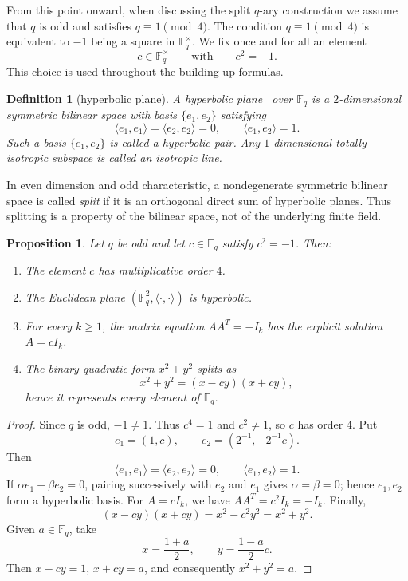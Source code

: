 \documentclass[12pt]{article}
\newtheorem{defn}{Definition}[section]
\newtheorem{prop}[theorem]{Proposition}
\newcommand{\F}{\mathbb{F}}
\begin{document}


From this point onward, when discussing the split \(q\)-ary construction we assume that \(q\) is odd and satisfies \(q \equiv 1 \pmod 4\). The condition \(q \equiv 1 \pmod 4\) is equivalent to $-1$ being a square in $\F_q^\times$. We fix once and for all an element
\[
c \in \F_q^\times \qquad \text{with} \qquad c^2 = -1.
\]
This choice is used throughout the building-up formulas.


\begin{defn}[hyperbolic plane]\label{def:hyp}
{\rm
A hyperbolic plane~\cite{Ser} over $\F_q$ is a $2$-dimensional symmetric bilinear space with basis $\{e_1,e_2\}$ satisfying
\[
\langle e_1,e_1\rangle = \langle e_2,e_2\rangle = 0,
\qquad
\langle e_1,e_2\rangle = 1.
\]
Such a basis \(\{e_1,e_2\}\) is called a hyperbolic pair. Any $1$-dimensional totally isotropic subspace is called an isotropic line.
}
\end{defn}

In even dimension and odd characteristic, a nondegenerate symmetric
bilinear space is called \emph{split} if it is an orthogonal direct sum of
hyperbolic planes. Thus splitting is a property of the bilinear space, not
of the underlying finite field.

\begin{prop}\label{prop:split-consequences}
Let \(q\) be odd and let \(c\in\F_q\) satisfy \(c^2=-1\). Then:
\begin{enumerate}[label=(\roman*)]
\item The element $c$ has multiplicative order $4$.
\item The Euclidean plane $(\F_q^2,\langle \cdot,\cdot\rangle)$ is hyperbolic.
\item For every $k \ge 1$, the matrix equation $AA^T = -I_k$ has the explicit solution $A=cI_k$.
\item The binary quadratic form $x^2+y^2$ splits as
\[
x^2+y^2 = (x-cy)(x+cy),
\]
hence it represents every element of\/ $\F_q$.
\end{enumerate}
\end{prop}

\begin{proof}
Since \(q\) is odd, \(-1\ne1\). Thus \(c^4=1\) and \(c^2\ne1\), so
\(c\) has order \(4\). Put
\[
e_1=(1,c),\qquad e_2=(2^{-1},-2^{-1}c).
\]
Then
\[
\langle e_1,e_1\rangle=\langle e_2,e_2\rangle=0,
\qquad \langle e_1,e_2\rangle=1.
\]
If \(\alpha e_1+\beta e_2=0\), pairing successively with \(e_2\) and
\(e_1\) gives \(\alpha=\beta=0\); hence \(e_1,e_2\) form a hyperbolic
basis. For \(A=cI_k\), we have \(AA^T=c^2I_k=-I_k\). Finally,
\[
(x-cy)(x+cy)=x^2-c^2y^2=x^2+y^2.
\]
Given \(a\in\F_q\), take
\[
x=\frac{1+a}{2},\qquad y=\frac{1-a}{2}c.
\]
Then \(x-cy=1\), \(x+cy=a\), and consequently
\(x^2+y^2=a\).
\end{proof}
\end{document}

